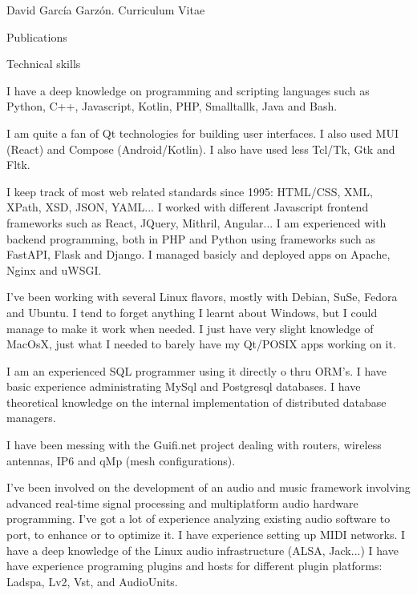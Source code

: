 \documentclass{article}
\begin{document}
\begin{cv}{David García Garzón. Curriculum Vitae}
\begin{cvlist}{Publications}
\end{cvlist}


\begin{cvlist}{Technical skills}

\item[Programming Languages]
	I have a deep knowledge on programming and scripting languages
such  as Python, C++, Javascript, Kotlin, PHP, Smalltallk, Java and Bash.


\item[Desktop/Mobile Programming]
	I am quite a fan of Qt technologies for building user interfaces.
I also used MUI (React) and Compose (Android/Kotlin).
I also have used less Tcl/Tk, Gtk and Fltk.


\item[Web Programming]
	I keep track of most web related standards since 1995:
HTML/CSS, XML, XPath, XSD, JSON, YAML...
I worked with different Javascript frontend frameworks such as React, JQuery, Mithril, Angular...
I am experienced with backend programming, both in PHP and Python using frameworks such as FastAPI, Flask and Django.
I managed basicly and deployed apps on Apache, Nginx and uWSGI.


\item[Operating systems]
	I've been working with several Linux flavors, mostly with Debian, SuSe, Fedora and Ubuntu.
I tend to forget anything I learnt about Windows, but I could manage to make it work when needed.
I just have very slight knowledge of MacOsX, just what I needed to barely have my Qt/POSIX apps working on it.


\item[Databases]
	I am an experienced SQL programmer using it directly o thru ORM's.
I have basic experience administrating MySql and Postgresql databases.
I have theoretical knowledge on the internal implementation of distributed database managers.


\item[Networks]
	I have been messing with the Guifi.net project dealing with routers, wireless antennas, IP6 and qMp (mesh configurations).


\item[Sound]
	I've been involved on the development of an audio and music framework
involving advanced real-time signal processing and
multiplatform audio hardware programming.
I've got a lot of experience analyzing existing audio software to port, to enhance or to optimize it.
I have experience setting up MIDI networks.
I have a deep knowledge of the Linux audio infrastructure (ALSA, Jack...)
I have have experience programing plugins and hosts for different plugin platforms: Ladspa, Lv2, Vst, and AudioUnits.



\end{cvlist}
\end{cv}
\end{document}
